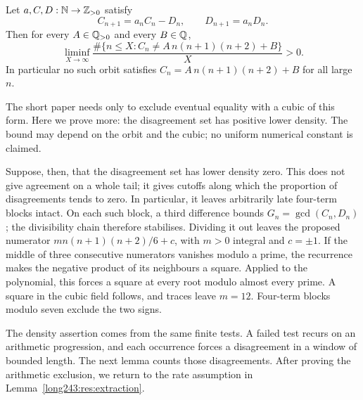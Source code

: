 \documentclass[11pt]{article}
\begin{document}
\begin{theorem}\label{long243:res:cubicexclusion}
Let $a,C,D:\mathbb{N}\to\mathbb{Z}_{>0}$ satisfy
\begin{equation}\label{long243:eq:cubicorbit}
 C_{n+1}=a_nC_n-D_n,\qquad D_{n+1}=a_nD_n .
\end{equation}
Then for every $A\in\mathbb{Q}_{>0}$ and every $B\in\mathbb{Q}$,
\[
 \liminf_{X\to\infty}
 \frac{\#\{n\le X:C_n\ne A\,n(n+1)(n+2)+B\}}{X}>0 .
\]
In particular no such orbit satisfies $C_n=A\,n(n+1)(n+2)+B$ for all
large $n$.
\end{theorem}

The short paper needs only to exclude eventual equality with a cubic
of this form. Here we prove more: the disagreement set has positive
lower density. The bound may depend on the orbit and the cubic; no
uniform numerical constant is claimed.

Suppose, then, that the disagreement set has lower density zero. This
does not give agreement on a whole tail; it gives cutoffs along which
the proportion of disagreements tends to zero. In particular, it
leaves arbitrarily late four-term blocks intact. On each such block,
a third difference bounds $G_n=\gcd(C_n,D_n)$; the divisibility chain
therefore stabilises. Dividing it out leaves the proposed numerator
$m n(n+1)(n+2)/6+c$, with $m>0$ integral and $c=\pm1$.
If the middle of three consecutive numerators vanishes modulo a prime,
the recurrence makes the negative product of its neighbours a square.
Applied to the polynomial, this forces a square at every root modulo
almost every prime. A square in the cubic field follows, and traces
leave $m=12$. Four-term blocks modulo seven exclude the two signs.

The density assertion comes from the same finite tests. A failed test
recurs on an arithmetic progression, and each occurrence forces a
disagreement in a window of bounded length. The next lemma counts
those disagreements. After proving the arithmetic exclusion, we return
to the rate assumption in Lemma~\ref{long243:res:extraction}.
\end{document}
